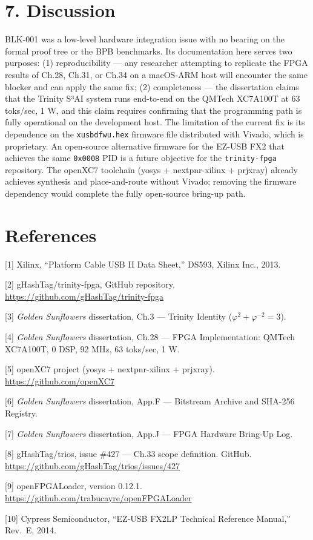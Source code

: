 \section{7. Discussion}\label{fa_33:discussion}

BLK-001 was a low-level hardware integration issue
with no bearing on the formal proof tree or the
BPB benchmarks. Its documentation here serves two
purposes: (1) reproducibility --- any researcher
attempting to replicate the FPGA results of Ch.28,
Ch.31, or Ch.34 on a macOS-ARM host will encounter
the same blocker and can apply the same fix; (2)
completeness --- the dissertation claims that the
Trinity S³AI system runs end-to-end on the QMTech
XC7A100T at 63 toks/sec, 1 W, and this claim
requires confirming that the programming path is
fully operational on the development host. The
limitation of the current fix is its dependence on
the \texttt{xusbdfwu.hex} firmware file
distributed with Vivado, which is proprietary. An
open-source alternative firmware for the EZ-USB
FX2 that achieves the same \texttt{0x0008} PID is
a future objective for the \texttt{trinity-fpga}
repository. The openXC7 toolchain (yosys +
nextpnr-xilinx + prjxray) already achieves
synthesis and place-and-route without Vivado;
removing the firmware dependency would complete
the fully open-source bring-up path.

\section{References}\label{fa_33:references}

[1] Xilinx, ``Platform Cable USB II Data
Sheet,'' DS593, Xilinx Inc., 2013.

[2] gHashTag/trinity-fpga, GitHub repository.
\url{https://github.com/gHashTag/trinity-fpga}

[3] \emph{Golden Sunflowers} dissertation,
Ch.3 --- Trinity Identity
(\(\varphi^2 + \varphi^{-2} = 3\)).

[4] \emph{Golden Sunflowers} dissertation,
Ch.28 --- FPGA Implementation: QMTech XC7A100T, 0
DSP, 92 MHz, 63 toks/sec, 1 W.

[5] openXC7 project (yosys + nextpnr-xilinx +
prjxray). \url{https://github.com/openXC7}

[6] \emph{Golden Sunflowers} dissertation,
App.F --- Bitstream Archive and SHA-256 Registry.

[7] \emph{Golden Sunflowers} dissertation,
App.J --- FPGA Hardware Bring-Up Log.

[8] gHashTag/trios, issue \#427 --- Ch.33
scope definition. GitHub.
\url{https://github.com/gHashTag/trios/issues/427}

[9] openFPGALoader, version 0.12.1.
\url{https://github.com/trabucayre/openFPGALoader}

[10] Cypress Semiconductor, ``EZ-USB FX2LP
Technical Reference Manual,'' Rev.~E, 2014.

